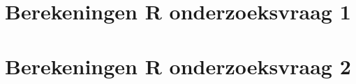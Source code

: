 \documentclass{bachproef-tin}
\begin{document}


\chapter{Berekeningen R onderzoeksvraag 1}
\label{bijlage:r-1}



\chapter{Berekeningen R onderzoeksvraag 2}
\label{bijlage:r-2}




\printbibliography[heading=bibintoc]
\end{document}
